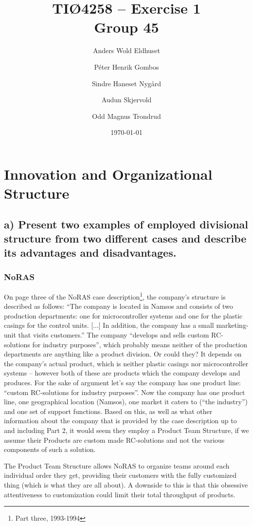 \documentclass[a4paper]{article}
\title{TIØ4258 -- Exercise 1 \\ Group 45}
\author{
    Anders Wold Eldhuset \and
    Péter Henrik Gombos \and
    Sindre Haneset Nygård \and
    Audun Skjervold \and
    Odd Magnus Trondrud
}
\date{\today}
\begin{document}
    \maketitle
    \newpage
    \setcounter{secnumdepth}{2}

    \section{Innovation and Organizational Structure} %

    \subsection*{a) Present two examples of employed divisional structure from
    two different cases and describe its advantages and disadvantages.}

    \subsubsection{NoRAS} On page three of the NoRAS case
    description\footnote{Part three, 1993-1994}, the company's structure is
    described as follows: ``The company is located in Namsos and consists
    of two production departments: one for microcontroller systems and one
    for the plastic casings for the control units. [...] In addition, the
    company has a small marketing-unit that visits customers.'' The company
    ``develops and sells custom RC-solutions for industry purposes'', which
    probably means neither of the production departments are anything like
    a product division. Or could they? It depends on the company's actual
    product, which is neither plastic casings nor microcontroller systems
    -- however both of these are products which the company develops and
    produces. For the sake of argument let's say the company has one product
    line: ``custom RC-solutions for industry purposes''. Now the company has
    one product line, one geographical location (Namsos), one market it caters
    to (``the industry'') and one set of support functions. Based on this, as
    well as what other information about the company that is provided by the
    case description up to and including Part 2, it would seem they employ
    a Product Team Structure, if we assume their Products are custom made
    RC-solutions and not the various components of such a solution.

    The Product Team Structure allows NoRAS to organize teams around each
    individual order they get, providing their customers with the fully
    customized thing (which is what they are all about).
    A downside to this is that this obsessive attentiveness to customization
    could limit their total throughput of products.
\end{document}
